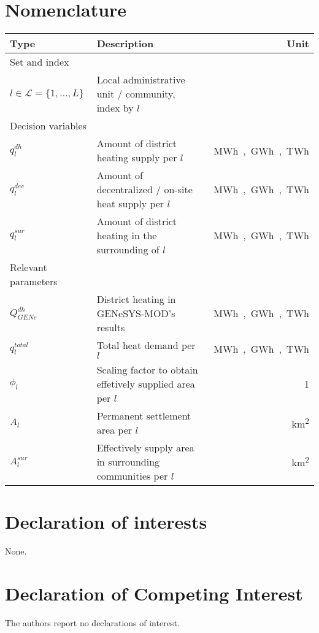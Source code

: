 \documentclass[review]{elsarticle}
\begin{document}
\section*{Nomenclature}
\begin{center}
	\renewcommand{\arraystretch}{1.1}
	\centering
	\small
	\begin{tabular}{lm{8cm}r}
		Type & Description & Unit\\
		\hline
		Set and index & & \\
		\hline
		
		{$l \in \mathcal{L}=\{1,\ldots,L\}$} & Local administrative unit / community, index by $l$\\
		\hline
		Decision variables\\
		\hline
		{$q^{dh}_{l}$} & Amount of district heating supply per $l$ & \SI{}{MWh, GWh, TWh}\\
		{$q^{dec}_{l}$} & Amount of decentralized / on-site heat supply per $l$ & \SI{}{MWh, GWh, TWh}\\
		{$q^{sur}_{l}$} & Amount of district heating in the surrounding of $l$ & \SI{}{MWh, GWh, TWh}\\
		\hline
		Relevant parameters\\
		\hline
		{$Q^{dh}_{GENe}$} & District heating in GENeSYS-MOD's results & \SI{}{MWh, GWh, TWh}\\
		{$q^{total}_{l}$} & Total heat demand per $l$ & \SI{}{MWh, GWh, TWh}\\
		{$\phi_{l}$} & Scaling factor to obtain effetively supplied area per $l$ & \SI{}{1}\\
		{$A_l$} & Permanent settlement area per $l$ & \SI{}{km^2}\\
		{$A^{sur}_l$} & Effectively supply area in surrounding communities per $l$ & \SI{}{km^2}\\
		\hline
	\end{tabular}
\end{center}
\newpage


\newpage




\section*{Declaration of interests}
None.
\section*{Declaration of Competing Interest}
The authors report no declarations of interest.
\end{document}
